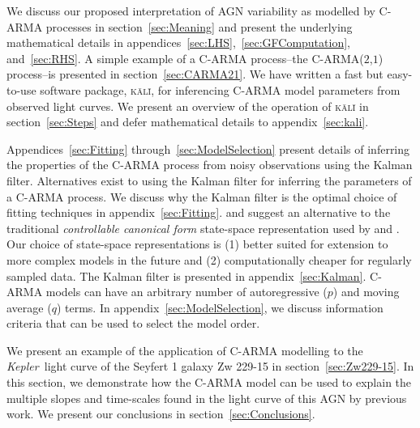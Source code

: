 \documentclass[a4paper,fleqn,usenatbib]{mnras}
\newcommand{\Kepler}{\textit{Kepler~}}
\begin{document}
We discuss our proposed interpretation of AGN variability as modelled by C-ARMA processes in section~\ref{sec:Meaning} and present the underlying mathematical details in appendices~\ref{sec:LHS},~\ref{sec:GFComputation}, and~\ref{sec:RHS}. A simple example of a C-ARMA process--the C-ARMA($2$,$1$) process--is presented in section~\ref{sec:CARMA21}. We have written a fast but easy-to-use software package, \textsc{k\={a}l\={i}}, for inferencing C-ARMA model parameters from observed light curves. We present an overview of the operation of \textsc{k\={a}l\={i}} in section~\ref{sec:Steps} and defer mathematical details to appendix~\ref{sec:kali}.

Appendices~\ref{sec:Fitting} through~\ref{sec:ModelSelection} present details of inferring the properties of the C-ARMA process from noisy observations using the Kalman filter. Alternatives exist to using the Kalman filter for inferring the parameters of a C-ARMA process. We discuss why the Kalman filter is the optimal choice of fitting techniques in appendix~\ref{sec:Fitting}. 
and suggest an alternative to the traditional \textit{controllable canonical form} state-space representation used by \citet{JonesAckerson90} and \citet{Brockwell14}. Our choice of state-space representations is (1) better suited for extension to more complex models in the future and (2) computationally cheaper for regularly sampled data. The Kalman filter is presented in appendix~\ref{sec:Kalman}. C-ARMA models can have an arbitrary number of autoregressive ($p$) and moving average ($q$) terms. In appendix~\ref{sec:ModelSelection}, we discuss information criteria that can be used to select the model order.

We present an example of the application of C-ARMA modelling to the \Kepler light curve of the Seyfert 1 galaxy Zw 229-15 in section~\ref{sec:Zw229-15}. In this section, we demonstrate how the C-ARMA model can be used to explain the multiple slopes and time-scales found in the light curve of this AGN by previous work. We present our conclusions in section~\ref{sec:Conclusions}.
\end{document}
